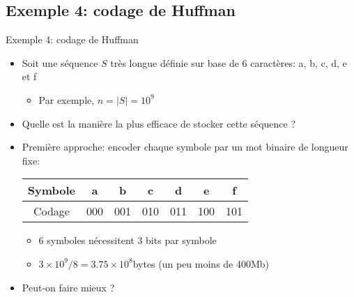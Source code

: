 \subsection{Exemple 4: codage de Huffman}

\begin{frame}{Exemple 4: codage de Huffman}
\begin{itemize}
\item Soit une séquence $S$ très longue définie sur base de 6 caractères: a, b, c, d, e et f
\begin{itemize}
\item Par exemple, $n=|S|=10^9$
\end{itemize}

\bigskip

\item Quelle est la manière la plus efficace de stocker cette séquence ?

\bigskip

\item Première approche: encoder chaque symbole par un mot binaire de
  longueur fixe:

\begin{center}
\begin{tabular}{c|cccccc}
Symbole & a & b & c & d & e & f\\
\hline
Codage & 000 & 001 & 010 & 011 & 100 & 101\\
\end{tabular}
\end{center}

\begin{itemize}
\item 6 symboles nécessitent 3 bits par symbole
\item $3\times 10^9/8=3.75\times 10^8$bytes (un peu moins de 400Mb)
\end{itemize}
\item Peut-on faire mieux ?
\end{itemize}

\end{frame}

